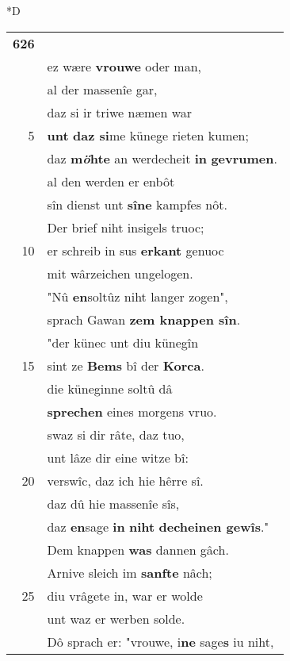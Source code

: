 \documentclass[8pt,a4paper,notitlepage]{article}
\begin{document}
\begin{table}[ht]
\begin{minipage}[t]{0.5\linewidth}
\small
\begin{center}*D
\end{center}
\begin{tabular}{rl}
\textbf{626} & \textbf{\textit{\begin{large}D\end{large}}ô} enbôt \textbf{ouch} hêr Gawan,\\ 
 & ez wære \textbf{vrouwe} oder man,\\ 
 & al der massenîe gar,\\ 
 & daz si ir triwe næmen war\\ 
5 & \textbf{unt} \textbf{daz si}me künege rieten kumen;\\ 
 & daz \textbf{m\textit{ö}hte} an werdecheit \textbf{in} \textbf{gevrumen}.\\ 
 & al den werden er enbôt\\ 
 & sîn dienst unt \textbf{sîne} kampfes nôt.\\ 
 & Der brief niht insigels truoc;\\ 
10 & er schreib in sus \textbf{erkant} genuoc\\ 
 & mit wârzeichen ungelogen.\\ 
 & "Nû \textbf{en}soltûz niht langer zogen",\\ 
 & sprach Gawan \textbf{zem knappen sîn}.\\ 
 & "der künec unt diu künegîn\\ 
15 & sint ze \textbf{Bems} bî der \textbf{Korca}.\\ 
 & die küneginne soltû dâ\\ 
 & \textbf{sprechen} eines morgens vruo.\\ 
 & swaz si dir râte, daz tuo,\\ 
 & unt lâze dir eine witze bî:\\ 
20 & verswîc, daz ich hie hêrre sî.\\ 
 & daz dû hie massenîe sîs,\\ 
 & daz \textbf{en}sage \textbf{in} \textbf{niht} \textbf{decheinen gewîs}."\\ 
 & Dem knappen \textbf{was} dannen gâch.\\ 
 & Arnive sleich im \textbf{sanfte} nâch;\\ 
25 & diu vrâgete in, war er wolde\\ 
 & unt waz er werben solde.\\ 
 & Dô sprach er: "vrouwe, i\textbf{ne} sage\textbf{s} iu niht,\\ 

\end{tabular}
\end{minipage}
\end{table}
\end{document}
